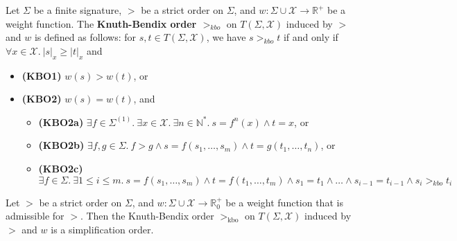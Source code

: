     \begin{definition}
    Let $\Sigma$ be a finite signature, $>$ be a strict order on $\Sigma$, and $w: \Sigma \mathop{\cup} \mathcal{X} \mathop{\rightarrow} \mathbb{R}^+$ be a weight function. The \textbf{Knuth-Bendix order $>_{kbo}$} on $T(\Sigma,\mathcal{X})$ induced by $>$ and $w$ is defined as follows: for $s, t \mathop{\in} T(\Sigma,\mathcal{X})$, we have \( s >_{kbo} t \) if and only if $\forall x \mathop{\in} \mathcal{X}.\ |s|_x \ge |t|_x$ and
    \begin{itemize}
        \item \textbf{(KBO1)} $w(s) \mathop{>} w(t)$, or
        \item \textbf{(KBO2)} $w(s) \mathop{=} w(t)$, and
        \begin{itemize}
            \item \textbf{(KBO2a)} $\exists f \mathop{\in} \Sigma^{(1)}.\ \exists x \mathop{\in} \mathcal{X}.\ \exists n \mathop{\in} \mathbb{N}^*.\ s \mathop{=} f^n(x) \mathop{\land} t \mathop{=} x$, or
            \item \textbf{(KBO2b)} $\exists f, g \mathop{\in} \Sigma.\ f \mathop{>} g \mathop{\land} s \mathop{=} f(s_1, \ldots, s_m) \mathop{\land} t \mathop{=} g(t_1, \ldots, t_n)$, or
            \item \textbf{(KBO2c)} $\exists f \mathop{\in} \Sigma.\ \exists 1 \le i \le m.\ s \mathop{=} f(s_1, \ldots, s_m) \mathop{\land} t \mathop{=} f(t_1, \ldots, t_m) \mathop{\land} s_1 \mathop{=} t_1 \mathop{\land} \ldots \mathop{\land} s_{i-1} \mathop{=} t_{i-1} \mathop{\land} s_i >_{kbo} t_i$
        \end{itemize}
    \end{itemize}
    \end{definition}
    
\begin{theorem}
Let $>$ be a strict order on $\Sigma$, and $w : \Sigma \mathop{\cup} \mathcal{X} \mathop{\rightarrow} \mathbb{R}^+_0$ be a weight function that is admissible for $>$. Then the Knuth-Bendix order $>_{\text{kbo}}$ on $T(\Sigma, \mathcal{X})$ induced by $>$ and $w$ is a simplification order.
\end{theorem}